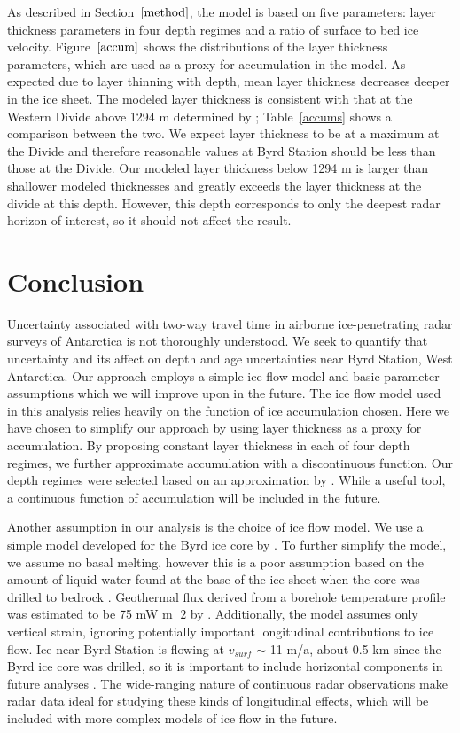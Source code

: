 \documentclass[12pt]{article}
\begin{document}
As described in Section~$\ref{method}$, the model is based on five parameters: layer thickness parameters in four depth regimes and a ratio of surface to bed ice velocity. Figure~$\ref{accum}$ shows the distributions of the layer thickness parameters, which are used as a proxy for accumulation in the model. As expected due to layer thinning with depth, mean layer thickness decreases deeper in the ice sheet. The modeled layer thickness is consistent with that at the Western Divide above 1294 m determined by \citep{neumann2008}; Table~\ref{accums} shows a comparison between the two. We expect layer thickness to be at a maximum at the Divide and therefore reasonable values at Byrd Station should be less than those at the Divide. Our modeled layer thickness below 1294 m is larger than shallower modeled thicknesses and greatly exceeds the layer thickness at the divide at this depth. However, this depth corresponds to only the deepest radar horizon of interest, so it should not affect the result.

\section{Conclusion}
Uncertainty associated with two-way travel time in airborne ice-penetrating radar surveys of Antarctica is not thoroughly understood. We seek to quantify that uncertainty and its affect on depth and age uncertainties near Byrd Station, West Antarctica. Our approach employs a simple ice flow model and basic parameter assumptions which we will improve upon in the future. The ice flow model used in this analysis relies heavily on the function of ice accumulation chosen. Here we have chosen to simplify our approach by using layer thickness as a proxy for accumulation. By proposing constant layer thickness in each of four depth regimes, we further approximate accumulation with a discontinuous function. Our depth regimes were selected based on an approximation by \citet{hammer1994}. While a useful tool, a continuous function of accumulation will be included in the future.

Another assumption in our analysis is the choice of ice flow model. We use a simple model developed for the Byrd ice core by \citet{morland2009}. To further simplify the model, we assume no basal melting, however this is a poor assumption based on the amount of liquid water found at the base of the ice sheet when the core was drilled to bedrock \citep{gow1968}. Geothermal flux derived from a borehole temperature profile was estimated to be 75 mW m$^-2$ by \citet{gow1968}. Additionally, the model assumes only vertical strain, ignoring potentially important longitudinal contributions to ice flow. Ice near Byrd Station is flowing at $v_{surf}$ $\sim$ 11 m/a, about 0.5 km since the Byrd ice core was drilled, so it is important to include horizontal components in future analyses \citep{bindschadler1997}. The wide-ranging nature of continuous radar observations make radar data ideal for studying these kinds of longitudinal effects, which will be included with more complex models of ice flow in the future.
\end{document}
